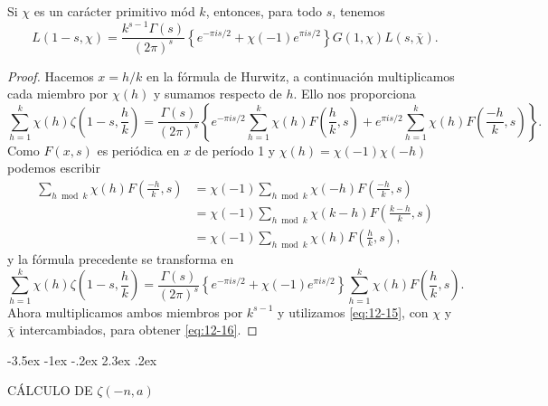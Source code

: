 \documentclass[12pt,a4paper]{book}
\makeatletter
\renewcommand\section{\@startsection{section}{1}{\z@}%
  {-3.5ex \@plus -1ex \@minus -.2ex}%
  {2.3ex \@plus .2ex}%
  {\normalfont\Large\bfseries\raggedright}}
\makeatother
\begin{document}
    \begin{teorema}\label{teo:12-11}
        Si $\chi$ es un carácter primitivo mód $k$, entonces, para todo $s$, tenemos
        \begin{equation}\label{eq:12-16}
            L(1-s,\chi)=\frac{k^{s-1}\Gamma(s)}{(2\pi)^{s}}\left\{e^{-\pi is/2}+\chi(-1)e^{\pi is/2}\right\}G(1,\chi)L(s,\bar{\chi}).
        \end{equation}
    \end{teorema}

    \begin{proof}
        Hacemos $x=h/k$ en la fórmula de Hurwitz, a continuación multiplicamos cada miembro por
        $\chi(h)$ y sumamos respecto de $h$. Ello nos proporciona
        \begin{equation*}
            \sum_{h=1}^{k}\chi(h)\zeta\left(1-s,\frac{h}{k}\right)=\frac{\Gamma(s)}{(2\pi)^{s}}\left\{e^{-\pi is/2}\sum_{h=1}^{k}\chi(h)F\left(\frac{h}{k},s\right)+e^{\pi is/2}\sum_{h=1}^{k}\chi(h)F\left(\frac{-h}{k},s\right)\right\}.
        \end{equation*}
        Como $F(x,s)$ es periódica en $x$ de período 1 y $\chi(h)=\chi(-1)\chi(-h)$ podemos
        escribir
        \begin{align*}
            \sum_{h\bmod k}\chi(h)F\left(\frac{-h}{k},s\right)&=\chi(-1)\sum_{h\bmod k}\chi(-h)F\left(\frac{-h}{k},s\right)\\
            &=\chi(-1)\sum_{h\bmod k}\chi(k-h)F\left(\frac{k-h}{k},s\right)\\
            &=\chi(-1)\sum_{h\bmod k}\chi(h)F\left(\frac{h}{k},s\right),
        \end{align*}
        y la fórmula precedente se transforma en
        \begin{equation*}
            \sum_{h=1}^{k}\chi(h)\zeta\left(1-s,\frac{h}{k}\right)=\frac{\Gamma(s)}{(2\pi)^{s}}\left\{e^{-\pi is/2}+\chi(-1)e^{\pi is/2}\right\}\sum_{h=1}^{k}\chi(h)F\left(\frac{h}{k},s\right).
        \end{equation*}
        Ahora multiplicamos ambos miembros por $k^{s-1}$ y utilizamos \eqref{eq:12-15}, con
        $\chi$ y $\bar{\chi}$ intercambiados, para obtener \eqref{eq:12-16}.
    \end{proof}

    \section{CÁLCULO DE \texorpdfstring{$\zeta(-n,a)$}{ζ(-n,a)}}\label{sim:Bn}
\end{document}
